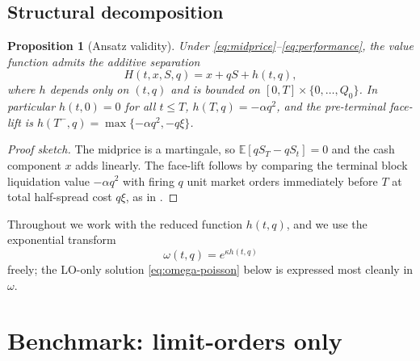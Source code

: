 \documentclass[]{interact}
\theoremstyle{plain}
\newtheorem{proposition}[theorem]{Proposition}
\theoremstyle{definition}
\theoremstyle{remark}
\newcommand{\E}{\mathbb{E}}
\newcommand{\1}[1]{\mathbf{1}_{\{#1\}}}
\begin{document}
\subsection{Structural decomposition}\label{sec:ansatz}
\begin{proposition}[Ansatz validity]\label{prop:ansatz}
Under \eqref{eq:midprice}--\eqref{eq:performance}, the value function admits the additive separation
\begin{equation}\label{eq:ansatz}
H(t,x,S,q) = x + q S + h(t,q),
\end{equation}
where $h$ depends only on $(t,q)$ and is bounded on $[0,T] \times \{0,\dots,Q_0\}$. In particular $h(t,0) = 0$ for all $t \le T$, $h(T,q)=-\alpha q^2$, and the pre-terminal face-lift is
$h(T^-, q) = \max\{-\alpha q^2, -q\xi\}$.
\end{proposition}
\begin{proof}[Proof sketch]
The midprice is a martingale, so $\E[q S_T - q S_t]= 0$ and the cash component $x$ adds linearly. The face-lift follows by comparing the terminal block liquidation value $-\alpha q^2$ with firing $q$ unit market orders immediately before $T$ at total half-spread cost $q\xi$, as in \citet[\S 8]{cjp2015}.
\end{proof}

Throughout we work with the reduced function $h(t,q)$, and we use the exponential transform
\begin{equation}\label{eq:omega}
\omega(t,q) = e^{\kappa h(t,q)}
\end{equation}
freely; the LO-only solution \eqref{eq:omega-poisson} below is expressed most cleanly in $\omega$.

\section{Benchmark: limit-orders only}\label{sec:lo-only}
\end{document}
